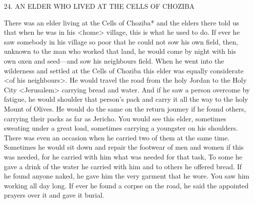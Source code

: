 24. AN ELDER WHO LIVED AT THE CELLS
OF CHOZIBA

There was an elder living at the Cells of Choziba* and the elders
there told us that when he was in his <home> village, this is what
he used to do. If ever he saw somebody in his village so poor that
he could not sow his own field, then, unknown to the man who
worked that land, he would come by night with his own oxen and
seed—and sow his neighbour\textquotesingle s field. When he went into the
wilderness and settled at the Cells of Choziba this elder was equally
considerate <of his neighbours>. He would travel the road from the
holy Jordan to the Holy City <Jerusalem> carrying bread and
water. And if he saw a person overcome by fatigue, he would
shoulder that person's pack and carry it all the way to the holy
Mount of Olives. He would do the same on the return joumey if he
found others, carrying their packs as far as Jericho. You would see
this elder, sometimes sweating under a great load, sometimes
carrying a youngster on his shoulders. There was even an occasion
when he carried two of them at the same time. Sometimes he would
sit down and repair the footwear of men and women if this was
needed, for he carried with him what was needed for that task, To
some he gave a drink of the water he carried with him and to others
he offered bread. If he found anyone naked, he gave him the very
garment that he wore. You saw him working all day long. If ever he
found a corpse on the road, he said the appointed prayers over it
and gave it burial.

